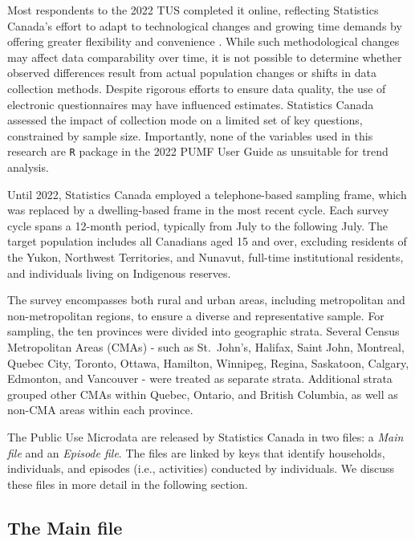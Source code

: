 \documentclass[Royal,times,sageh]{sagej}
\begin{document}
Most respondents to the 2022 TUS completed it online, reflecting
Statistics Canada's effort to adapt to technological changes and growing
time demands by offering greater flexibility and convenience
\citep{statisticscanada2022}. While such methodological changes may
affect data comparability over time, it is not possible to determine
whether observed differences result from actual population changes or
shifts in data collection methods. Despite rigorous efforts to ensure
data quality, the use of electronic questionnaires may have influenced
estimates. Statistics Canada assessed the impact of collection mode on a
limited set of key questions, constrained by sample size. Importantly,
none of the variables used in this research are \texttt{R} package in
the 2022 PUMF User Guide as unsuitable for trend analysis.

Until 2022, Statistics Canada employed a telephone-based sampling frame,
which was replaced by a dwelling-based frame in the most recent cycle.
Each survey cycle spans a 12-month period, typically from July to the
following July. The target population includes all Canadians aged 15 and
over, excluding residents of the Yukon, Northwest Territories, and
Nunavut, full-time institutional residents, and individuals living on
Indigenous reserves.

The survey encompasses both rural and urban areas, including
metropolitan and non-metropolitan regions, to ensure a diverse and
representative sample. For sampling, the ten provinces were divided into
geographic strata. Several Census Metropolitan Areas (CMAs) - such as
St.~John's, Halifax, Saint John, Montreal, Quebec City, Toronto, Ottawa,
Hamilton, Winnipeg, Regina, Saskatoon, Calgary, Edmonton, and Vancouver
- were treated as separate strata. Additional strata grouped other CMAs
within Quebec, Ontario, and British Columbia, as well as non-CMA areas
within each province.

The Public Use Microdata are released by Statistics Canada in two files:
a \emph{Main file} and an \emph{Episode file}. The files are linked by
keys that identify households, individuals, and episodes (i.e.,
activities) conducted by individuals. We discuss these files in more
detail in the following section.

\subsection{The Main file}\label{the-main-file}
\end{document}
